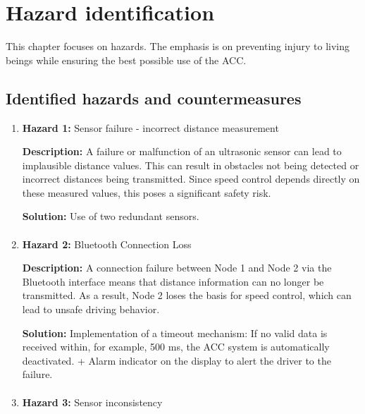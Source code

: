 \section{Hazard identification}
\label{chapter4}

This chapter focuses on hazards. The emphasis is on preventing injury to living beings while ensuring the best possible use of the ACC.

\subsection{Identified hazards and countermeasures}


	\begin{enumerate}
		\item \textbf{Hazard 1:} Sensor failure - incorrect distance measurement
            
            \textbf{Description:} A failure or malfunction of an ultrasonic sensor can lead to implausible distance values. This can result in obstacles not being detected or incorrect distances being transmitted. Since speed control depends directly on these measured values, this poses a significant safety risk.
            
            \textbf{Solution:} Use of two redundant sensors.

        \paragraph{}
		\item \textbf{Hazard 2:} Bluetooth Connection Loss
            
            \textbf{Description:} A connection failure between Node 1 and Node 2 via the Bluetooth interface means that distance information can no longer be transmitted. As a result, Node 2 loses the basis for speed control, which can lead to unsafe driving behavior.
            
            \textbf{Solution:} Implementation of a timeout mechanism: If no valid data is received within, for example, 500 ms, the ACC system is automatically deactivated. + Alarm indicator on the display to alert the driver to the failure.
        
        \paragraph{}
		\item \textbf{Hazard 3:} Sensor inconsistency
            

\end{enumerate}
